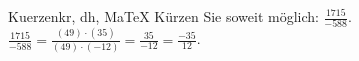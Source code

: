 \begin{MAufgabe}{Kuerzen}{kr, dh, MaTeX}
K\"urzen Sie soweit m\"oglich: $\frac{1715}{-588}$.\\ 
\ifLsg\MLoesung
\quad $\frac{1715}{-588}=\frac{(49)\cdot(35)}{(49)\cdot(-12)}=\frac{35}{-12}=\frac{-35}{12}$.\else\relax\fi
 \end{MAufgabe}